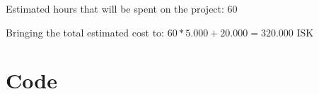 \documentclass{article}
\begin{document}
Estimated hours that will be spent on the project: 60

Bringing the total estimated cost to: $60*5.000 + 20.000 = 320.000$ ISK

\newpage
\appendix
\section{Code}\label{appendix:code}




\end{document}
